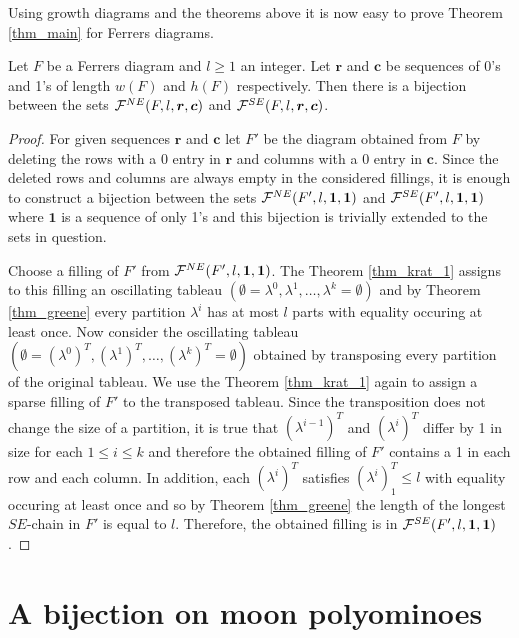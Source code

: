 Using growth diagrams and the theorems above it is now easy to prove Theorem \ref{thm_main} for Ferrers diagrams.

\begin{thm} \label{thm_krat_3}
Let $F$ be a Ferrers diagram and $l \geq 1$ an integer. Let $\bm{r}$ and $\bm{c}$ be sequences of 0's and 1's
of length $w(F)$ and $h(F)$ respectively. 
Then there is a bijection between the sets $\mathcal{F}^{NE}(F, l, \bm{r}, \bm{c})$ and $\mathcal{F}^{SE}(F, l, \bm{r}, \bm{c})$.
\end{thm}
\begin{proof}
For given sequences $\bm{r}$ and $\bm{c}$ let $F'$ be the diagram obtained from $F$ by deleting the rows
with a 0 entry in $\bm{r}$ and columns with a 0 entry in $\bm{c}$. Since the deleted rows and columns
are always empty in the considered fillings, it is enough to construct a bijection
between the sets $\mathcal{F}^{NE}(F',l,\bm{1},\bm{1})$ and $\mathcal{F}^{SE}(F',l,\bm{1},\bm{1})$ where $\bm{1}$ is a sequence of only 1's
and this bijection is trivially extended to the sets in question.

Choose a filling of $F'$ from $\mathcal{F}^{NE}(F',l,\bm{1},\bm{1})$. The Theorem \ref{thm_krat_1} assigns to this filling
an oscillating tableau $(\emptyset = \lambda^0, \lambda^1, \ldots, \lambda^k = \emptyset)$ and by Theorem \ref{thm_greene}
every partition $\lambda^i$ has at most $l$ parts with equality occuring at least once. Now consider
the oscillating tableau $(\emptyset = (\lambda^0)^T, (\lambda^1)^T, \ldots, (\lambda^k)^T = \emptyset)$
obtained by transposing every partition of the original tableau. We use the Theorem \ref{thm_krat_1} again
to assign a sparse filling of $F'$ to the transposed tableau. Since the transposition does not change the size
of a partition, it is true that $(\lambda^{i-1})^T$ and $(\lambda^{i})^T$ differ by 1 in size for each $1 \leq i \leq k$
and therefore the obtained filling of $F'$ contains a 1 in each row and each column. In addition, each $(\lambda^i)^T$
satisfies $(\lambda^i)^T_1 \leq l$ with equality occuring at least once and so by Theorem \ref{thm_greene} the
length of the longest $SE$-chain in $F'$ is equal to $l$. Therefore, the obtained filling is in $\mathcal{F}^{SE}(F', l, \bm{1}, \bm{1})$.
\end{proof}

\section{A bijection on moon polyominoes} \label{sec4}

